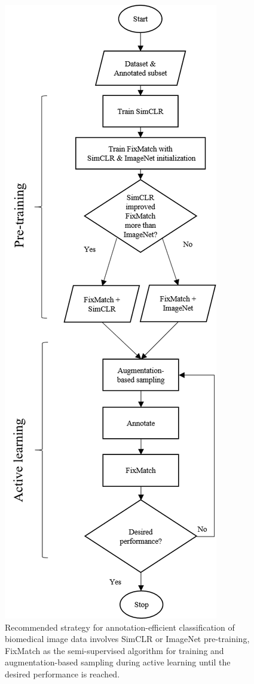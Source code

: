 \begin{figure}[htbp]
\centering
\captionsetup{format=plain}
\includegraphics[height=0.65\textheight]{figures/fig_results_4.png}
\caption{Recommended strategy for annotation-efficient classification of biomedical image data involves SimCLR or ImageNet pre-training, FixMatch as the semi-supervised algorithm for training and augmentation-based sampling during active learning until the desired performance is reached.}
\label{fig:results_4}
\end{figure}